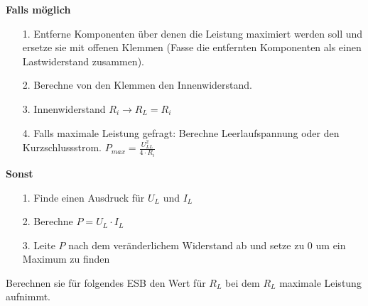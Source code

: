 																														\newpage
																														\beginvor
\textbf{Falls möglich}
\begin{itemize}
  \item [1. ] Entferne Komponenten über denen die Leistung maximiert werden soll und ersetze sie mit offenen Klemmen (Fasse die entfernten Komponenten als einen Lastwiderstand zusammen).
  \item [2. ] Berechne von den Klemmen den Innenwiderstand.
  \item [3. ] Innenwiderstand $R_i \rightarrow R_L = R_i$
  \item [4. ] Falls maximale Leistung gefragt: Berechne Leerlaufspannung oder den Kurzschlussstrom. $\displaystyle P_{max} = \frac{U_{LL}^2} {4 \cdot R_i } $
\end{itemize}

\textbf{Sonst}

\begin{itemize}
  \item [1. ] Finde einen Ausdruck für $U_L$ und $I_L$
	\item [2. ] Berechne $P = U_L \cdot I_L$
	\item [3. ] Leite $P$ nach dem veränderlichem Widerstand ab und setze zu 0 um ein Maximum zu finden
\end{itemize}


																														\iend

\beginbsp
Berechnen sie für folgendes ESB den Wert für $R_L$ bei dem $R_L$ maximale Leistung aufnimmt.
\begin{center}
\end{center}
\iend

